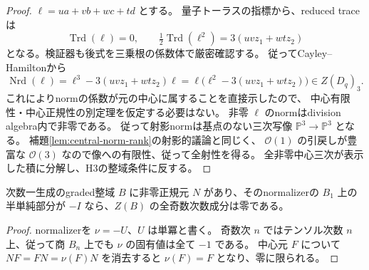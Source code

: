 \begin{proof}
$\ell=u a+v b+w c+t d$ とする。
量子トーラスの指標から、reduced traceは
\[
 \operatorname{Trd}(\ell)=0,\qquad
 \tfrac12\operatorname{Trd}(\ell^2)=3(uvz_1+wtz_2)
\]
となる。検証器も後式を三乗根の係数体で厳密確認する。
従ってCayley--Hamiltonから
\[
 \operatorname{Nrd}(\ell)
  =\ell^3-3(uvz_1+wtz_2)\ell
  =\ell\bigl(\ell^2-3(uvz_1+wtz_2)\bigr)\in Z(D_q)_3.
\]
これによりnormの係数が元の中心に属することを直接示したので、
中心有限性・中心正規性の別定理を仮定する必要はない。
非零 $\ell$ のnormはdivision algebra内で非零である。
従って射影normは基点のない三次写像 $\mathbb P^3\to\mathbb P^3$ となる。
補題\ref{lem:central-norm-rank}の射影的議論と同じく、
$\mathcal O(1)$ の引戻しが豊富な $\mathcal O(3)$ なので像への有限性、従って全射性を得る。
全非零中心三次が表示した積に分解し、H3の整域条件に反する。
\end{proof}

\begin{lemma}[他の正規元のスペクトルによる奇数中心の消滅]
\label{lem:normalizer-minus-unipotent-odd-centre}
次数一生成のgraded整域 $B$ に非零正規元 $N$ があり、そのnormalizerの
$B_1$ 上の半単純部分が $-I$ なら、$Z(B)$ の全奇数次数成分は零である。
\end{lemma}
\begin{proof}
normalizerを $\nu=-U$、$U$ は単冪と書く。
奇数次 $n$ ではテンソル次数 $n$ 上、従って商 $B_n$ 上でも $\nu$ の固有値は全て $-1$ である。
中心元 $F$ について $NF=FN=\nu(F)N$ を消去すると $\nu(F)=F$ となり、零に限られる。
\end{proof}

